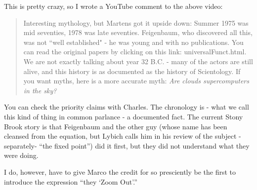 \begin{description}
This is pretty crazy, so I wrote a YouTube comment to the above video:

\begin{quote}
Interesting mythology, but Martens got it upside down: Summer 1975 was
mid seventies, 1978 was late seventies. Feigenbaum, who discovered all
this, was not ``well established" - he was young and with no
publications. You can read the original papers by clicking on this link:
{universalFunct.html}. We are not
exactly talking about year 32 B.C. - many of the actors are still alive,
and this history is as documented as the history of Scientology. If you
want myths, here is a more accurate myth:
 {\em Are clouds supercomputers in the
sky?}
\end{quote}

You can check the priority claims with Charles. The chronology is - what
we call this kind of thing in common parlance - a documented fact. The
current Stony Brook story is that Feigenbaum and the other guy (whose
name has been cleansed from the equation, but Lybich calls him in his
review of the subject -separately- ``the fixed point'') did it first, but
they did not understand what they were doing.

I do, however, have to give Marco the credit for so presciently be the
first to introduce the expression ``they  `Zoom Out'.''

\end{description}



\printbibliography[heading=subbibintoc,title={References}]
